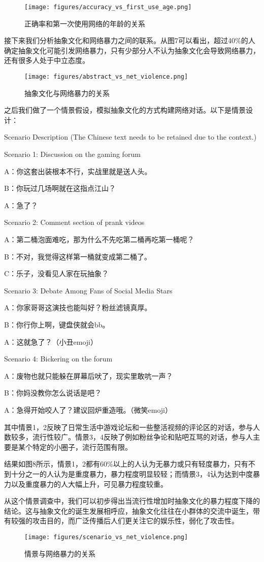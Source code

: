 \documentclass[12pt,a4paper]{ctexart}
\begin{document}
\begin{figure}[htbp]
    \centering
    \texttt{[image: figures/accuracy\_vs\_first\_use\_age.png]}
    \caption{正确率和第一次使用网络的年龄的关系}
    \label{fig:accuracy_vs_first_use_age}
\end{figure}

接下来我们分析抽象文化和网络暴力之间的联系。从图7可以看出，超过40\%的人确定抽象文化可能引发网络暴力，只有少部分人不认为抽象文化会导致网络暴力，还有很多人处于中立态度。

\begin{figure}[htbp]
    \centering
    \texttt{[image: figures/abstract\_vs\_net\_violence.png]}
    \caption{抽象文化与网络暴力的关系}
    \label{fig:abstract_vs_net_violence}
\end{figure}

之后我们做了一个情景假设，模拟抽象文化的方式构建网络对话。以下是情景设计：

Scenario Description (The Chinese text needs to be retained due to the context.)

Scenario 1: Discussion on the gaming forum

A：你这套出装根本不行，实战里就是送人头。

B：你玩过几场啊就在这指点江山？

A：急了？

Scenario 2: Comment section of prank videos

A：第二桶泡面难吃，那为什么不先吃第二桶再吃第一桶呢？

B：不对，我觉得这样第一桶就变成第二桶了。

C：乐子，没看见人家在玩抽象？

Scenario 3: Debate Among Fans of Social Media Stars

A：你家哥哥这演技也能叫好？粉丝滤镜真厚。

B：你行你上啊，键盘侠就会bb。

A：这就急了？（小丑emoji）

Scenario 4: Bickering on the forum

A：废物也就只能躲在屏幕后吠了，现实里敢吭一声？

B：你妈没教你怎么说话是吧？

A：急得开始咬人了？建议回炉重造哦。（微笑emoji）

其中情景1，2反映了日常生活中游戏论坛和一些整活视频的评论区的对话，参与人数较多，流行性较广。情景3，4反映了例如粉丝争论和贴吧互骂的对话，参与人主要是某个特定的小圈子，流行范围有限。 

结果如图8所示，情景1，2都有60\%以上的人认为无暴力或只有轻度暴力，只有不到十分之一的人认为是重度暴力，暴力程度明显较轻；而情景3，4认为达到中度暴力以及重度暴力的人大幅上升，可见暴力程度较重。

从这个情景调查中，我们可以初步得出当流行性增加时抽象文化的暴力程度下降的结论。这与抽象文化的诞生发展相呼应，抽象文化往往在小群体的交流中诞生，带有较强的攻击目的，而广泛传播后人们更关注它的娱乐性，弱化了攻击性。

\begin{figure}[htbp]
    \centering
    \texttt{[image: figures/scenario\_vs\_net\_violence.png]}
    \caption{情景与网络暴力的关系}
    \label{fig:scenario_vs_net_violence}
\end{figure}
\end{document}
